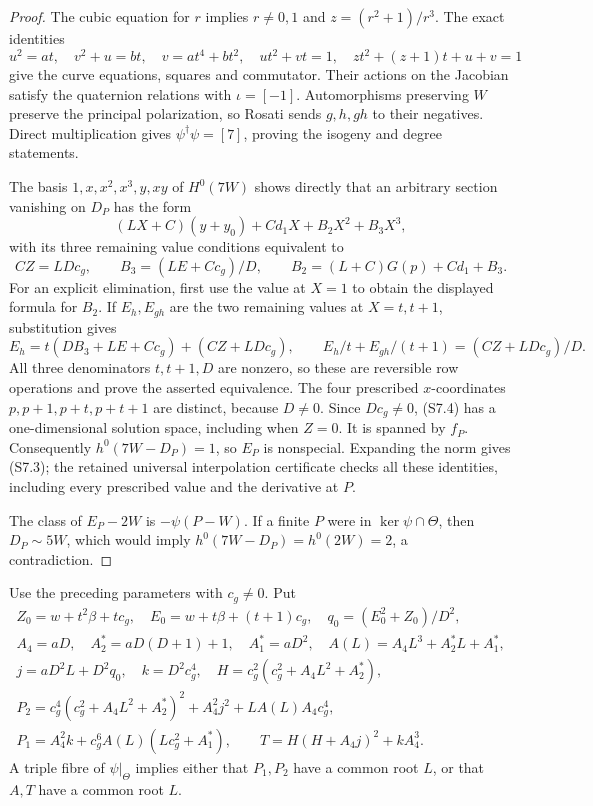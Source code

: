 \begin{proof}
The cubic equation for $r$ implies $r\ne0,1$ and $z=(r^2+1)/r^3$.
The exact identities
\[
 u^2=at,\quad v^2+u=bt,\quad v=at^4+bt^2,
 \quad ut^2+vt=1,\quad zt^2+(z+1)t+u+v=1
\]
give the curve equations, squares and commutator. Their actions on the
Jacobian satisfy the quaternion relations with $\iota=[-1]$.
Automorphisms preserving $W$ preserve the principal polarization, so
Rosati sends $g,h,gh$ to their negatives. Direct multiplication gives
$\psi^\dagger\psi=[7]$, proving the isogeny and degree statements.

The basis $1,x,x^2,x^3,y,xy$ of $H^0(7W)$ shows directly that an
arbitrary section vanishing on $D_P$ has the form
\[
 (LX+C)(y+y_0)+Cd_1X+B_2X^2+B_3X^3,
\]
with its three remaining value conditions equivalent to
\[
 CZ=LDc_g,\qquad
 B_3=(LE+Cc_g)/D,\qquad
 B_2=(L+C)G(p)+Cd_1+B_3.                         \tag{S7.4}
\]
For an explicit elimination, first use the value at $X=1$ to obtain
the displayed formula for $B_2$. If $E_h,E_{gh}$ are the two
remaining values at $X=t,t+1$, substitution gives
\[
 E_h=t(DB_3+LE+Cc_g)+(CZ+LDc_g),\qquad
 E_h/t+E_{gh}/(t+1)=(CZ+LDc_g)/D.
\]
All three denominators $t,t+1,D$ are nonzero, so these are reversible
row operations and prove the asserted equivalence.
The four prescribed $x$-coordinates $p,p+1,p+t,p+t+1$ are distinct,
because $D\ne0$. Since $Dc_g\ne0$, (S7.4) has a one-dimensional
solution space, including when $Z=0$. It is spanned by $f_P$.
Consequently $h^0(7W-D_P)=1$, so $E_P$ is nonspecial.
Expanding the norm gives (S7.3); the retained universal interpolation
certificate checks all these identities, including every prescribed
value and the derivative at $P$.

The class of $E_P-2W$ is $-\psi(P-W)$. If a finite $P$ were in
$\ker\psi\cap\Theta$, then $D_P\sim5W$, which would imply
$h^0(7W-D_P)=h^0(2W)=2$, a contradiction.
\end{proof}

\begin{lemma}
\label{lem:uniform-seven-triple-obstruction-candidate}
Use the preceding parameters with $c_g\ne0$. Put
\[
\begin{gathered}
 Z_0=w+t^2\beta+tc_g,\quad
 E_0=w+t\beta+(t+1)c_g,\quad q_0=(E_0^2+Z_0)/D^2,\\
 A_4=aD,\quad A_2^*=aD(D+1)+1,\quad A_1^*=aD^2,
 \quad A(L)=A_4L^3+A_2^*L+A_1^*,\\
 j=aD^2L+D^2q_0,\quad k=D^2c_g^4,\quad
 H=c_g^2(c_g^2+A_4L^2+A_2^*),\\
 P_2=c_g^4(c_g^2+A_4L^2+A_2^*)^2+A_4^2j^2
                         +LA(L)A_4c_g^4,\\
 P_1=A_4^2k+c_g^6A(L)(Lc_g^2+A_1^*),\qquad
 T=H(H+A_4j)^2+kA_4^3.
\end{gathered}                                                   \tag{S7.5}
\]
A triple fibre of $\psi|_\Theta$ implies either that $P_1,P_2$
have a common root $L$, or that $A,T$ have a common root $L$.
\end{lemma}

